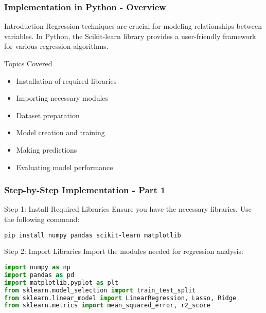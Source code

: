 \documentclass[aspectratio=169]{beamer}
\begin{document}
\begin{frame}[fragile]
    \frametitle{Implementation in Python - Overview}
    \begin{block}{Introduction}
        Regression techniques are crucial for modeling relationships between variables. In Python, the Scikit-learn library provides a user-friendly framework for various regression algorithms.
    \end{block}
    
    \begin{block}{Topics Covered}
        \begin{itemize}
            \item Installation of required libraries
            \item Importing necessary modules
            \item Dataset preparation
            \item Model creation and training
            \item Making predictions
            \item Evaluating model performance
        \end{itemize}
    \end{block}
\end{frame}

\begin{frame}[fragile]
    \frametitle{Step-by-Step Implementation - Part 1}
    \begin{block}{Step 1: Install Required Libraries}
        Ensure you have the necessary libraries. Use the following command:
        \begin{lstlisting}[language=bash]
pip install numpy pandas scikit-learn matplotlib
        \end{lstlisting}
    \end{block}
    
    \begin{block}{Step 2: Import Libraries}
        Import the modules needed for regression analysis:
        \begin{lstlisting}[language=python]
import numpy as np
import pandas as pd
import matplotlib.pyplot as plt
from sklearn.model_selection import train_test_split
from sklearn.linear_model import LinearRegression, Lasso, Ridge
from sklearn.metrics import mean_squared_error, r2_score
        \end{lstlisting}
    \end{block}
\end{frame}
\end{document}
